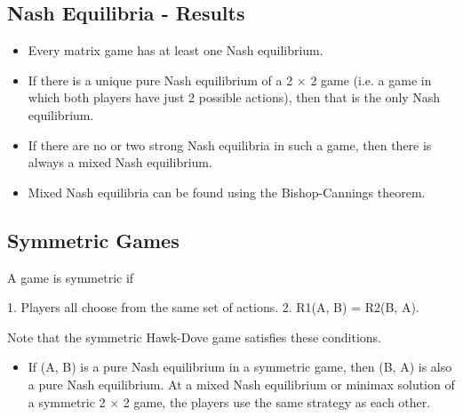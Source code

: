 \documentclass[]{article}
\begin{document}
	\subsection{Nash Equilibria - Results}
	\begin{itemize}
		\item Every matrix game has at least one Nash equilibrium.
		\item If there is a unique pure Nash equilibrium of a 2 × 2 game (i.e. a
		game in which both players have just 2 possible actions), then that
		is the only Nash equilibrium.
		\item If there are no or two strong Nash equilibria in such a game, then
		there is always a mixed Nash equilibrium.
		\item Mixed Nash equilibria can be found using the Bishop-Cannings
		theorem.
	\end{itemize}
	
	\subsection{Symmetric Games}
	A game is symmetric if
\begin{enumerate}
	1. Players all choose from the same set of actions.
	2. R1(A, B) = R2(B, A).
\end{enumerate}
	Note that the symmetric Hawk-Dove game satisfies these
	conditions.
\begin{itemize}
\item	If (A, B) is a pure Nash equilibrium in a symmetric game, then
	(B, A) is also a pure Nash equilibrium.
\tiem	At a mixed Nash equilibrium or minimax solution of a symmetric
	2 × 2 game, the players use the same strategy as each other.
\end{itemize}	%
\end{document}
